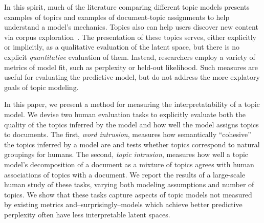 In this spirit, much of the literature comparing different topic models presents examples of topics and examples of document-topic assignments to help understand a model's mechanics.  Topics also can help users discover new content via corpus exploration~\cite{mimno-07a}.  The presentation of these topics serves, either explicitly or implicitly, as a qualitative evaluation of the latent space, but there is no explicit \emph{quantitative} evaluation of them.  Instead, researchers employ a variety of metrics of model fit, such as perplexity or held-out likelihood.  Such measures are useful for evaluating the predictive model, but do not address the more explatory goals of topic modeling.

In this paper, we present a method for measuring the
interpretatability of a topic model.  We devise two human evaluation
tasks to explicitly evaluate both the quality of the topics inferred
by the model and how well the model assigns topics to documents.  The
first, \emph{word intrusion}, measures how semantically ``cohesive''
the topics inferred by a model are and tests whether topics correspond
to natural groupings for humans.  The second, \emph{topic intrusion},
measures how well a topic model's decomposition of a document as a
mixture of topics agrees with human associations of topics with a
document.  We report the results of a large-scale human study of these
tasks, varying both modeling assumptions and number of topics.  We
show that these tasks capture aspects of topic models not measured by
existing metrics and--surprisingly--models which achieve better
predictive perplexity often have less interpretable latent spaces.

